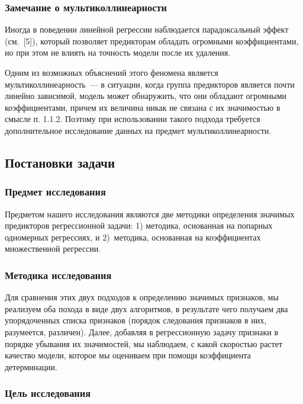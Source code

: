 \documentclass[a4paper,12pt]{article}
\begin{document}
\subsubsection{Замечание о мультиколлинеарности}

Иногда в поведении линейной регрессии наблюдается парадоксальный эффект (см. [5]), который позволяет предикторам обладать огромными коэффициентами, но при этом не влиять на точность модели после их удаления. 

Одним из возможных объяснений этого феномена является мультиколлинеарность — в ситуации, когда группа предикторов является почти линейно зависимой, модель может обнаружить, что они обладают огромными коэффициентами, причем их величина никак не связана с их значимостью в смысле п. 1.1.2. Поэтому при использовании такого подхода требуется дополнительное исследование данных на предмет мультиколлинеарности.

\subsection{Постановки задачи}

\subsubsection{Предмет исследования}

Предметом нашего исследования являются две методики определения значимых предикторов регрессионной задачи: 1) методика, основанная на попарных одномерных регрессиях, и 2) методика, основанная на коэффициентах множественной регрессии.

\subsubsection{Методика исследования} 

Для сравнения этих двух подходов к определению значимых признаков, мы реализуем оба похода в виде двух алгоритмов, в результате чего получаем два упорядоченных списка признаков (порядок следования признаков в них, разумеется, различен). Далее, добавляя в регрессионную задачу признаки в порядке убывания их значимостей, мы наблюдаем, с какой скоростью растет качество модели, которое мы оцениваем при помощи коэффициента детерминации.

\subsubsection{Цель исследования} 
\end{document}
